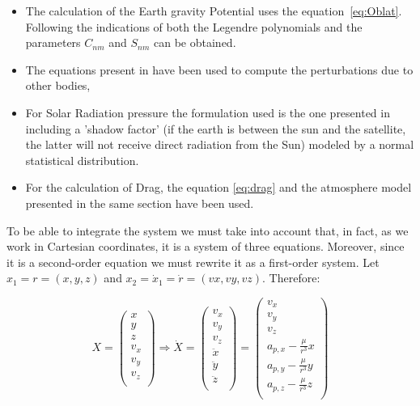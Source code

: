 \begin{itemize}
\item The calculation of the Earth gravity Potential uses the equation~\ref{eq:Oblat}. Following the indications of \cite{Bate1971} both the Legendre polynomials and the parameters $C _{nm}$ and $S _{nm}$ can be obtained.

\item The equations present in \cite{Junkins} have been used to compute the perturbations due to other bodies,  

\item For Solar Radiation pressure the formulation used is the one presented in\cite{Kufa} including a 'shadow factor' (if the earth is between the sun and the satellite, the latter will not receive direct radiation from the Sun) modeled by a normal statistical distribution.

\item For the calculation of Drag, the equation \ref{eq:drag} and the atmosphere model presented in the same section have been used.
\end{itemize}


To be able to integrate the system we must take into account that, in fact, as we work in Cartesian coordinates, it is a system of three equations. Moreover, since it is a second-order equation we must rewrite it as a first-order system. Let $x_1=r=(x, y, z)$ and $x_2=\dot{x}_1=\dot{r}=(vx, vy, vz)$. Therefore:

\begin{equation}
X=
\begin{pmatrix}
 x\\ 
 y\\ 
 z\\ 
 v_x\\ 
 v_y\\ 
 v_z\\  
 \end{pmatrix}
\Rightarrow
\dot{X}=
\begin{pmatrix}
 v_x\\ 
 v_y\\ 
 v_z\\  
\ddot{x}\\ 
\ddot{y}\\ 
\ddot{z}\\  
 \end{pmatrix}
=
\begin{pmatrix}
 v_x\\ 
 v_y\\ 
 v_z\\  
 a_{p,x}-\frac{\mu}{r^3}x\\ 
 a_{p,y}-\frac{\mu}{r^3}y\\ 
 a_{p,z}-\frac{\mu}{r^3}z\\  
 \end{pmatrix}
\end{equation}

